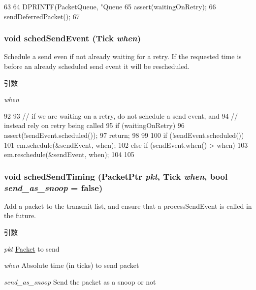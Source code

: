 \begin{DoxyCode}
63 {
64     DPRINTF(PacketQueue, "Queue %
65     assert(waitingOnRetry);
66     sendDeferredPacket();
67 }
\end{DoxyCode}
\hypertarget{classPacketQueue_af99adfc2df426c1ebd4e1fcb804c7e4d}{
\subsubsection[{schedSendEvent}]{\setlength{\rightskip}{0pt plus 5cm}void schedSendEvent ({\bf Tick} {\em when})}}
\label{classPacketQueue_af99adfc2df426c1ebd4e1fcb804c7e4d}
Schedule a send even if not already waiting for a retry. If the requested time is before an already scheduled send event it will be rescheduled.


\begin{DoxyParams}{引数}
\item[{\em when}]\end{DoxyParams}



\begin{DoxyCode}
92 {
93     // if we are waiting on a retry, do not schedule a send event, and
94     // instead rely on retry being called
95     if (waitingOnRetry) {
96         assert(!sendEvent.scheduled());
97         return;
98     }
99 
100     if (!sendEvent.scheduled()) {
101         em.schedule(&sendEvent, when);
102     } else if (sendEvent.when() > when) {
103         em.reschedule(&sendEvent, when);
104     }
105 }
\end{DoxyCode}
\hypertarget{classPacketQueue_a9b0fd72bebb706403e57dd17daff1f40}{
\subsubsection[{schedSendTiming}]{\setlength{\rightskip}{0pt plus 5cm}void schedSendTiming ({\bf PacketPtr} {\em pkt}, \/  {\bf Tick} {\em when}, \/  bool {\em send\_\-as\_\-snoop} = {\ttfamily false})}}
\label{classPacketQueue_a9b0fd72bebb706403e57dd17daff1f40}
Add a packet to the transmit list, and ensure that a processSendEvent is called in the future.


\begin{DoxyParams}{引数}
\item[{\em pkt}]\hyperlink{classPacket}{Packet} to send \item[{\em when}]Absolute time (in ticks) to send packet \item[{\em send\_\-as\_\-snoop}]Send the packet as a snoop or not \end{DoxyParams}



